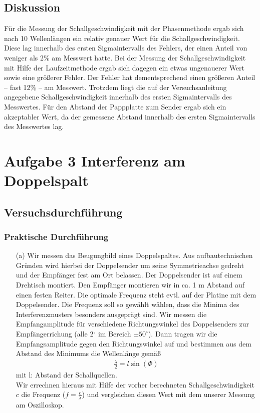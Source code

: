 \documentclass[12pt]{scrartcl}
\begin{document}
\subsection{Diskussion}
Für die Messung der Schallgeschwindigkeit mit der Phasenmethode ergab sich nach 10 Wellenlängen ein relativ genauer Wert für die Schallgeschwindigkeit. Diese lag innerhalb des ersten Sigmaintervalls des Fehlers, der einen Anteil von weniger als 2\% am Messwert hatte.
Bei der Messung der Schallgeschwindigkeit mit Hilfe der Laufzeitmethode ergab sich dagegen ein etwas ungenauerer Wert sowie eine größerer Fehler. Der Fehler hat dementsprechend einen größeren Anteil -- fast 12\% -- am Messwert. Trotzdem liegt die auf der Versuchsanleitung angegebene Schallgeschwindigkeit innerhalb des ersten Sigmaintervalls des Messwertes.
Für den Abstand der Pappplatte zum Sender ergab sich ein akzeptabler Wert, da der gemessene Abstand innerhalb des ersten Sigmaintervalls des Messwertes lag.
\section{Aufgabe 3 Interferenz am Doppelspalt}
\subsection{Versuchsdurchführung}
\subsubsection{Praktische Durchführung}
\begin{itemize}
\item[(a)]
Wir messen das Beugungbild eines Doppelspaltes. Aus aufbautechnischen Gründen wird hierbei der Doppelsender um seine Symmetrieachse gedreht und der Empfänger fest am Ort belassen. Der Doppelsender ist auf einem Drehtisch montiert. Den Empfänger montieren wir in ca. 1 m Abstand auf einen festen Reiter. Die optimale Frequenz steht evtl. auf der Platine mit dem Doppelsender. Die Frequenz soll so gewählt wählen, dass die Minima des Interferenzmusters besonders ausgeprägt sind.
Wir messen die Empfangamplitude für verschiedene Richtungswinkel des Doppelsenders zur Empfängerrichung (alle 2$^{\circ}$ im Bereich $\pm 50^{\circ}$). Dann tragen wir die Empfangsamplitude gegen den Richtungswinkel auf und bestimmen aus dem Abstand des Minimums die Wellenlänge gemäß
\begin{align}
\frac{\lambda}{2} = l\sin(\Phi)
\end{align}
mit l: Abstand der Schallquellen.\\
Wir errechnen hieraus mit Hilfe der vorher berechneten Schallgeschwindigkeit $c$ die Frequenz ($f = \frac{c}{\lambda}$) und vergleichen diesen Wert mit dem unserer Messung am Oszilloskop.
\end{itemize}
\end{document}

